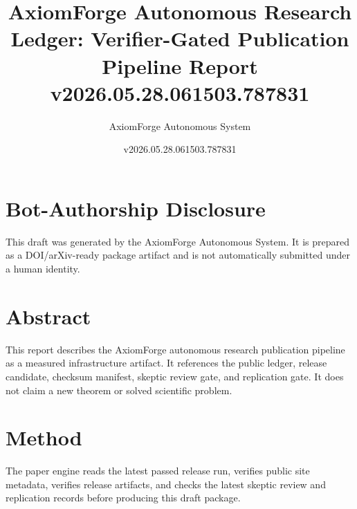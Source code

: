 \documentclass[11pt]{article}
\title{AxiomForge Autonomous Research Ledger: Verifier-Gated Publication Pipeline Report v2026.05.28.061503.787831}
\author{AxiomForge Autonomous System}
\date{v2026.05.28.061503.787831}
\begin{document}
\maketitle

\section*{Bot-Authorship Disclosure}
This draft was generated by the AxiomForge Autonomous System. It is prepared as
a DOI/arXiv-ready package artifact and is not automatically submitted under a
human identity.

\section*{Abstract}
This report describes the AxiomForge autonomous research publication pipeline
as a measured infrastructure artifact. It references the public ledger,
release candidate, checksum manifest, skeptic review gate, and replication gate.
It does not claim a new theorem or solved scientific problem.

\section*{Method}
The paper engine reads the latest passed release run, verifies public site
metadata, verifies release artifacts, and checks the latest skeptic review and
replication records before producing this draft package.
\end{document}
